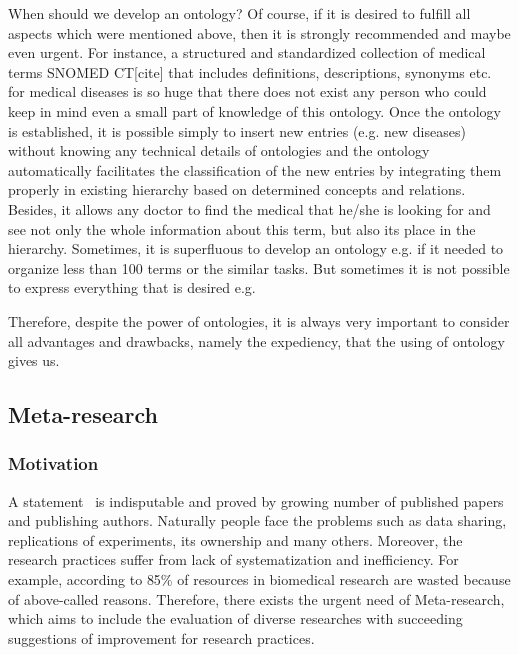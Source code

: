 		When should we develop an ontology? Of course, if it is desired to fulfill all aspects which were mentioned above, then it is strongly recommended and maybe even urgent. For instance, a structured and standardized collection of medical terms SNOMED CT[cite] that includes definitions, descriptions, synonyms etc. for medical diseases is so huge that there does not exist any person who could keep in mind even a small part of knowledge of this ontology. Once the ontology is established, it is possible simply to insert new entries (e.g. new diseases) without knowing any technical details of ontologies and the ontology automatically facilitates the classification of the new entries by integrating them properly in existing hierarchy based on determined concepts and relations. Besides, it allows any doctor to find the medical that he/she is looking for and see not only the whole information about this term, but also its place in the hierarchy. 
		Sometimes, it is superfluous to develop an ontology e.g. if it needed to organize less than 100 terms or the similar tasks. But sometimes it is not possible to express everything that is desired e.g. \frqq[cite]        
		
		Therefore, despite the power of ontologies, it is always very important to consider all advantages and drawbacks, namely the expediency, that the using of ontology gives us.  
	\subsection{Meta-research}
		\subsubsection{Motivation}
		A statement \frqq \ is indisputable and proved by growing number of published papers and publishing authors\cite{Ioa14}. Naturally people face the problems such as data sharing, replications of experiments, its ownership and many others. Moreover, the research practices suffer from lack of systematization and inefficiency. For example, according to \cite{Mac14}  85\% of resources in biomedical research are wasted because of above-called reasons. Therefore, there exists the urgent need of Meta-research, which aims to include the evaluation of diverse researches with succeeding suggestions of improvement for research practices.    
		

